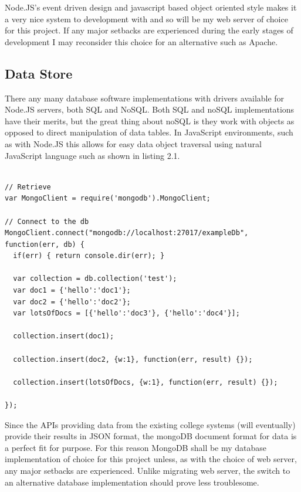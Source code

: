 \documentclass[a4paper, 12pt, notitlepage]{report}
\begin{document}
Node.JS's event driven design and javascript based object oriented style makes it a very nice system to development with and so will be my web server of choice for this project.  If any major setbacks are experienced during the early stages of development I may reconsider this choice for an alternative such as Apache.

\subsection{Data Store}

There any many database software implementations with drivers available for Node.JS servers, both SQL and NoSQL.  Both SQL and noSQL implementations have their merits, but the great thing about noSQL is they work with objects as opposed to direct manipulation of data tables.  In JavaScript environments, such as with Node.JS this allows for easy data object traversal using natural JavaScript language such as shown in listing 2.1. 

\begin{minipage}{\textwidth}
\begin{lstlisting}[captionpos=b,caption=MongoDB Data Creation and Insertion, tabsize=2,
    breaklines=true]

// Retrieve
var MongoClient = require('mongodb').MongoClient;

// Connect to the db
MongoClient.connect("mongodb://localhost:27017/exampleDb", function(err, db) {
  if(err) { return console.dir(err); }

  var collection = db.collection('test');
  var doc1 = {'hello':'doc1'};
  var doc2 = {'hello':'doc2'};
  var lotsOfDocs = [{'hello':'doc3'}, {'hello':'doc4'}];

  collection.insert(doc1);

  collection.insert(doc2, {w:1}, function(err, result) {});

  collection.insert(lotsOfDocs, {w:1}, function(err, result) {});

});

\end{lstlisting}
\end{minipage}

Since the APIs providing data from the existing college systems (will eventually) provide their results in JSON format, the mongoDB document format for data is a perfect fit for purpose.  For this reason MongoDB shall be my database implementation of choice for this project unless, as with the choice of web server, any major setbacks are experienced.  Unlike migrating web server, the switch to an alternative database implementation should prove less troublesome.
\end{document}
